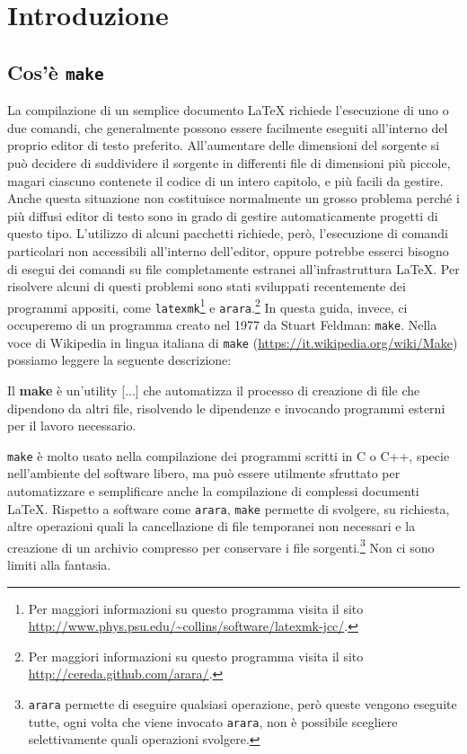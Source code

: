 \cleardoublepage
\chapter{Introduzione}
\label{cha:introduzione}

\section{Cos'è \texttt{make}}
\label{sec:cose-make}

La compilazione di un semplice documento \LaTeX{}
richiede l'esecuzione di uno o due comandi, che generalmente possono essere
facilmente eseguiti all'interno del proprio editor di testo preferito.
All'aumentare delle dimensioni del sorgente si può decidere di suddividere il
sorgente in differenti file di dimensioni più piccole, magari ciascuno contenete
il codice di un intero capitolo, e più facili da gestire.  Anche questa
situazione non costituisce normalmente un grosso problema perché i più diffusi
editor di testo sono in grado di gestire automaticamente progetti di questo
tipo.  L'utilizzo di alcuni pacchetti richiede, però, l'esecuzione di comandi
particolari non accessibili all'interno dell'editor, oppure potrebbe esserci
bisogno di esegui dei comandi su file completamente estranei all'infrastruttura
\LaTeX{}.
Per risolvere alcuni di questi problemi sono stati sviluppati recentemente dei
programmi appositi, come
\texttt{latexmk}\footnote{Per maggiori informazioni su questo programma visita
  il sito \url{http://www.phys.psu.edu/~collins/software/latexmk-jcc/}.}
e
\texttt{arara}.\footnote{Per maggiori informazioni su questo programma visita il
  sito \url{http://cereda.github.com/arara/}.}
In questa guida, invece, ci occuperemo di un programma creato nel 1977 da Stuart
Feldman: \texttt{make}.  Nella voce di Wikipedia in lingua italiana di
\texttt{make} (\url{https://it.wikipedia.org/wiki/Make}) possiamo leggere la
seguente descrizione:
\begin{quoting}
  Il \textbf{make} è un'utility [...] che automatizza il processo di creazione
  di file che dipendono da altri file, risolvendo le dipendenze e invocando
  programmi esterni per il lavoro necessario.
\end{quoting}
\texttt{make} è molto usato nella compilazione dei programmi scritti in C o C++,
specie nell'ambiente del software libero, ma può essere utilmente sfruttato per
automatizzare e semplificare anche la compilazione di complessi documenti
\LaTeX{}.
Rispetto a software come \texttt{arara}, \texttt{make} permette di svolgere, su
richiesta, altre operazioni quali la cancellazione di file temporanei non
necessari e la creazione di un archivio compresso per conservare i file
sorgenti.\footnote{\texttt{arara} permette di eseguire qualsiasi operazione,
  però queste vengono eseguite tutte, ogni volta che viene invocato
  \texttt{arara}, non è possibile scegliere selettivamente quali operazioni
  svolgere.}  Non ci sono limiti alla fantasia.


